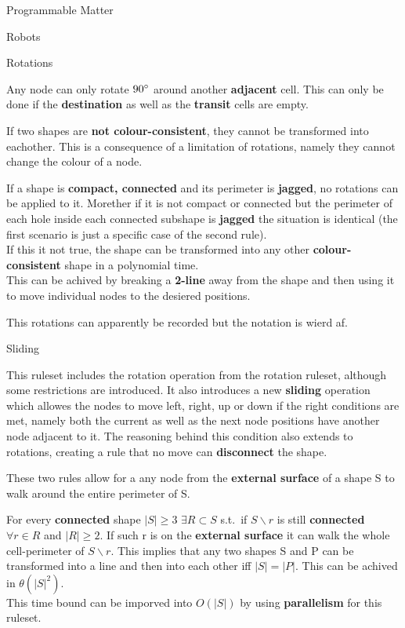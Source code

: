 \documentclass[12pt, letterpaper]{article}
\begin{document}
\begin{section}{Programmable Matter}
\begin{subsection}{Robots}
    \begin{subsubsection}{Rotations}

      Any node can only rotate \(90 \degree\) around another \textbf{adjacent}
      cell. This can only be done if the \textbf{destination} as well as the
      \textbf{transit} cells are empty.

      If two shapes are \textbf{not colour-consistent}, they cannot be
      transformed into eachother. This is a consequence of a limitation of
      rotations, namely they cannot change the colour of a node.

      If a shape is \textbf{compact, connected} and its perimeter is
      \textbf{jagged}, no rotations can be applied to it. Morether if it is not
      compact or connected but the perimeter of each hole inside each connected
      subshape is \textbf{jagged} the situation is identical (the first
      scenario is just a specific case of the second rule). \\
      If this it not true, the shape can be transformed into any other
      \textbf{colour-consistent} shape in a polynomial time. \\
      This can be achived by breaking a \textbf{2-line} away from the shape and
      then using it to move individual nodes to the desiered positions.

      This rotations can apparently be recorded but the notation is wierd af.

    \end{subsubsection}

    \begin{subsubsection}{Sliding}

      This ruleset includes the rotation operation from the rotation ruleset,
      although some restrictions are introduced. It also introduces a new
      \textbf{sliding} operation which allowes the nodes to move left, right,
      up or down if the right conditions are met, namely both the current as
      well as the next node positions have another node adjacent to it. The
      reasoning behind this condition also extends to rotations, creating a
      rule that no move can \textbf{disconnect} the shape.

      These two rules allow for a any node from the \textbf{external surface}
      of a shape S to walk around the entire perimeter of S.

      For every \textbf{connected} shape \(| S | \geq 3\) \(\exists R \subset
      S\) s.t.\ if \(S \backslash r\) is still \textbf{connected} \(\forall r
      \in R\) and \(| R | \geq 2\). If such r is on the \textbf{external
        surface} it can walk the whole cell-perimeter of \(S \backslash r\).
      This implies that any two shapes S and P can be transformed into a line
      and then into each other iff \(| S | = | P |\). This can be achived in
      \(\theta(| S |^{2})\). \\
      This time bound can be imporved into \(O(| S |)\) by using
      \textbf{parallelism} for this ruleset.


\end{subsubsection}
\end{subsection}
\end{section}
\end{document}
